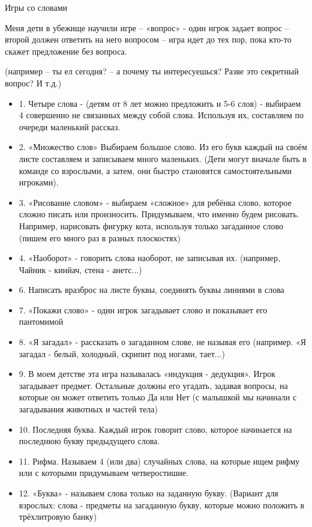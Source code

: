 Игры со словами

Меня дети в убежище научили игре – «вопрос» - один игрок задает вопрос – второй
должен ответить на него вопросом – игра идет до тех пор, пока кто-то скажет
предложение без вопроса.

(например – ты ел сегодня? – а почему ты интересуешься? Разве это секретный вопрос? И т.д.)

\begin{itemize}
  \item 1. Четыре слова - (детям от 8 лет можно предложить и 5-6 слов) - выбираем 4 совершенно не связанных между собой слова. Используя их, составляем по очереди маленький рассказ.
  \item 2. «Множество слов» Выбираем большое слово. Из его букв каждый на своём листе составляем и записываем много маленьких. (Дети могут вначале быть в команде со взрослыми, а затем, они быстро становятся самостоятельными игроками).
  \item 3. «Рисование словом» - выбираем «сложное» для ребёнка слово, которое сложно писать или произносить. Придумываем, что именно будем рисовать. Например, нарисовать фигурку кота, используя только загаданное слово (пишем его много раз в разных плоскостях)
  \item 4. «Наоборот» - говорить слова наоборот, не записывая их. (например, Чайник - кинйач, стена - анетс...)
  \item 6. Написать вразброс на листе буквы, соединять буквы линиями в слова
  \item 7. «Покажи слово» - один игрок загадывает слово и показывает его пантомимой
  \item 8. «Я загадал» - рассказать о загаданном слове, не называя его (например. «Я загадал - белый, холодный, скрипит под ногами, тает...)
  \item 9. В моем детстве эта игра называлась «индукция - дедукция». Игрок загадывает предмет. Остальные должны его угадать, задавая вопросы, на которые он может ответить только Да или Нет (с малышкой мы начинали с загадывания животных и частей тела)
  \item 10. Последняя буква. Каждый игрок говорит слово, которое начинается на последнюю букву предыдущего слова.
  \item 11. Рифма. Называем 4 (или два) случайных слова, на которые ищем рифму или с которыми придумываем четверостишие.
  \item 12. «Буква» - называем слова только на заданную букву. (Вариант для взрослых: слова - предметы на загаданную букву, которые можно положить в трёхлитровую банку)

\end{itemize}
